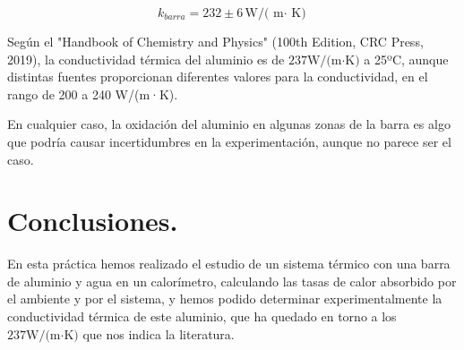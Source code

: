 \documentclass[a4paper,12pt,spanish]{article}
\begin{document}
	
	\[ \boxed{k_{barra} = 232 \pm 6  \text{W/( m$\cdot$ K)}     }
	\]
	
	
	Según el "Handbook of Chemistry and Physics" (100th Edition, CRC Press, 2019), la conductividad térmica del aluminio es de $237 \text{W/(m·K)}$ a 25ºC, aunque distintas fuentes proporcionan diferentes valores para la conductividad, en el rango de 200 a 240 W/(m·K).
	
	En cualquier caso, la oxidación del aluminio en algunas zonas de la barra es algo que podría causar incertidumbres en la experimentación, aunque no parece ser el caso.
	
	
	\section{Conclusiones.}
	
	\iffalse
	Se incluirá una breve sección de conclusiones donde se expongan las principales conclusiones del estudio.
	
	'' En conclusión hemos visto tal propiedad y comprobado experimentalmente la relación entre tal y cual cosa.''
	
	
	
	\begin{enumerate}
		\item Determinar la capacidad calorífica de un calorímetro a partir de calorimetría de intercambio de calor.
		\item Establecer equilibrios térmicos en calorimetría.
		\item Determinar experimentalmente la conductividad térmica.
	\end{enumerate}
	\fi	
	
	
	En esta práctica hemos realizado el estudio de un sistema térmico con una barra de aluminio y agua en un calorímetro, calculando las tasas de calor absorbido por el ambiente y por el sistema, y hemos podido determinar experimentalmente la conductividad térmica de este aluminio, que ha quedado en torno a los  $237 \text{W/(m·K)}$ que nos indica la literatura.
	
	
	\iffalse
	
	\begin{thebibliography}{3}
		
		
		
		
		\bibitem{UNED2022} (varios) Guiones de prácticas- Técnicas Experimentales II. Grado en Física. Versión 2.1  UNED, 2022 \url{https://2022.cursosvirtuales.uned.es/o/3754218}
		
		
		\bibitem{UNED2021} (varios) Técnicas Experimentales I. Versión 3.5.  UNED, 2021 \url{https://2021.cursosvirtuales.uned.es/o/42035617}
		
		
		
	\end{thebibliography}
	\fi
	
	
	
	
	
\end{document}
